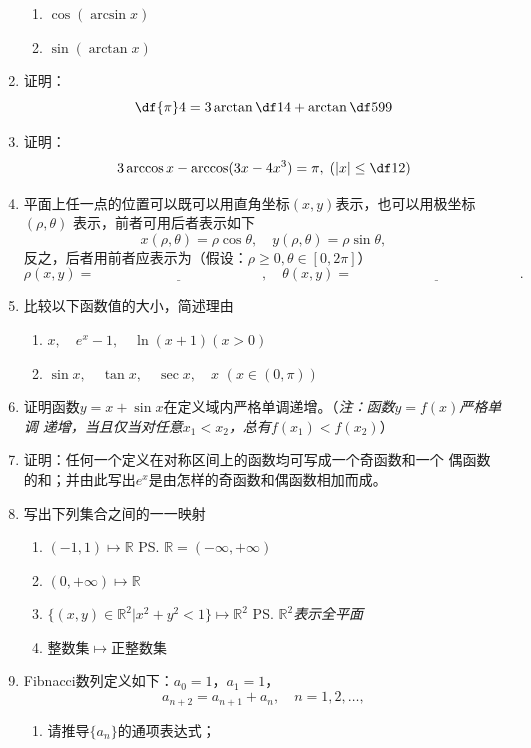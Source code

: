\begin{enumerate}
  \begin{enumerate}[(1)]
    \item $\cos(\arcsin x)$
    \item $\sin(\arctan x)$
  \end{enumerate}
  \item 证明：
  $$\df{\pi}4=3\arctan\df14+\arctan\df5{99}$$
  \item 证明：
  $$3\arccos x-\arccos(3x-4x^3)=\pi,\;\left(|x|\leq\df12\right)$$
  \item 平面上任一点的位置可以既可以用直角坐标$(x,y)$表示，也可以用极坐标$(\rho,\theta)$
  表示，前者可用后者表示如下
  $$x(\rho,\theta)=\rho\cos\theta,\quad y(\rho,\theta)=\rho\sin\theta,$$
  反之，后者用前者应表示为（假设：$\rho\geq 0,\theta\in[0,2\pi]$）
  $$\rho(x,y)=\underline{\hspace{5cm}},\quad
  \theta(x,y)=\underline{\hspace{5cm}}.$$
  \item 比较以下函数值的大小，简述理由
  \begin{enumerate}[(1)]
    \item $x,\quad e^x-1,\quad \ln(x+1)$\quad$(x>0)$
    \item $\sin x,\quad \tan x, \quad \sec x, \quad x$ \quad $(x\in(0,\pi))$
  \end{enumerate}
  \item 证明函数$y=x+\sin x$在定义域内严格单调递增。（{\it 注：函数$y=f(x)$严格单调
  递增，当且仅当对任意$x_1<x_2$，总有$f(x_1)<f(x_2)$}）
  \item 证明：任何一个定义在对称区间上的函数均可写成一个奇函数和一个
  偶函数的和；并由此写出$e^x$是由怎样的奇函数和偶函数相加而成。
  \item 写出下列集合之间的一一映射
  \begin{enumerate}[(1)]
    \item $(-1,1)\mapsto\mathbb{R}$
    \ps{$\mathbb{R}=(-\infty,+\infty)$}
    \item $(0,+\infty)\mapsto\mathbb{R}$
    \item $\{(x,y)\in\mathbb{R}^2|x^2+y^2<1\}\mapsto\mathbb{R}^2$
    \ps{\it $\mathbb{R}^2$表示全平面}
    \item 整数集$\mapsto$正整数集
  \end{enumerate}
  \item Fibnacci数列定义如下：$a_0=1$，$a_1=1$，
  $$a_{n+2}=a_{n+1}+a_{n},\quad n=1,2,\ldots,$$
  \begin{enumerate}[(1)]
    \item 请推导$\{a_n\}$的通项表达式；

\end{enumerate}
\end{enumerate}
